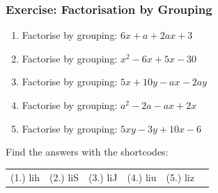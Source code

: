             \subsubsection{Exercise: Factorisation by Grouping }
            \nopagebreak
      \label{m39394*id279000}\begin{enumerate}[noitemsep, label=\textbf{\arabic*}. ] 
            \label{m39394*uid48}\item Factorise by grouping: $6x+a+2ax+3$
\newline
        \label{m39394*uid49}\item Factorise by grouping: ${x}^{2}-6x+5x-30$\newline
        \label{m39394*uid50}\item Factorise by grouping: $5x+10y-ax-2ay$\newline
        \label{m39394*uid51}\item Factorise by grouping: ${a}^{2}-2a-ax+2x$\newline
        \label{m39394*uid52}\item Factorise by grouping: $5xy-3y+10x-6$\newline
        \end{enumerate}
  \label{m39394**end}
\par {} Find the answers with the shortcodes:
 \par \begin{tabular}[h]{cccccc}
 (1.) lih  &  (2.) liS  &  (3.) liJ  &  (4.) liu  &  (5.) liz  & \end{tabular}
\label{m39387*secfhsst!!!underscore!!!id1269}\vspace{.5cm} 
      \noindent
